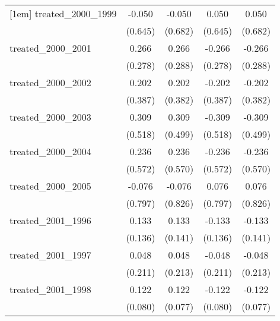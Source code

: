 {\begin{tabular}{l*{4}{c}}
[1em]
treated\_2000\_1999&      -0.050         &      -0.050         &       0.050         &       0.050         \\
            &     (0.645)         &     (0.682)         &     (0.645)         &     (0.682)         \\
[1em]
treated\_2000\_2001&       0.266         &       0.266         &      -0.266         &      -0.266         \\
            &     (0.278)         &     (0.288)         &     (0.278)         &     (0.288)         \\
[1em]
treated\_2000\_2002&       0.202         &       0.202         &      -0.202         &      -0.202         \\
            &     (0.387)         &     (0.382)         &     (0.387)         &     (0.382)         \\
[1em]
treated\_2000\_2003&       0.309         &       0.309         &      -0.309         &      -0.309         \\
            &     (0.518)         &     (0.499)         &     (0.518)         &     (0.499)         \\
[1em]
treated\_2000\_2004&       0.236         &       0.236         &      -0.236         &      -0.236         \\
            &     (0.572)         &     (0.570)         &     (0.572)         &     (0.570)         \\
[1em]
treated\_2000\_2005&      -0.076         &      -0.076         &       0.076         &       0.076         \\
            &     (0.797)         &     (0.826)         &     (0.797)         &     (0.826)         \\
[1em]
treated\_2001\_1996&       0.133         &       0.133         &      -0.133         &      -0.133         \\
            &     (0.136)         &     (0.141)         &     (0.136)         &     (0.141)         \\
[1em]
treated\_2001\_1997&       0.048         &       0.048         &      -0.048         &      -0.048         \\
            &     (0.211)         &     (0.213)         &     (0.211)         &     (0.213)         \\
[1em]
treated\_2001\_1998&       0.122         &       0.122         &      -0.122         &      -0.122         \\
            &     (0.080)         &     (0.077)         &     (0.080)         &     (0.077)         \\

\end{tabular}}
